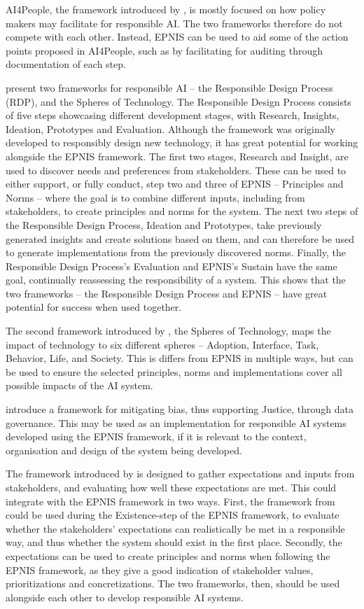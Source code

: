 AI4People, the framework introduced by \textcite{Floridi_2018}, is mostly focused on how policy makers may facilitate for responsible AI. The two frameworks therefore do not compete with each other. Instead, EPNIS can be used to aid some of the action points proposed in AI4People, such as by facilitating for auditing through documentation of each step.

\textcite{Peters_2020} present two frameworks for responsible AI -- the Responsible Design Process (RDP), and the Spheres of Technology. The Responsible Design Process consists of five steps showcasing different development stages, with Research, Insights, Ideation, Prototypes and Evaluation. Although the framework was originally developed to responsibly design new technology, it has great potential for working alongside the EPNIS framework. The first two stages, Research and Insight, are used to discover needs and preferences from stakeholders. These can be used to either support, or fully conduct, step two and three of EPNIS -- Principles and Norms -- where the goal is to combine different inputs, including from stakeholders, to create principles and norms for the system. The next two steps of the Responsible Design Process, Ideation and Prototypes, take previously generated insights and create solutions based on them, and can therefore be used to generate implementations from the previously discovered norms. Finally, the Responsible Design Process's Evaluation and EPNIS's Sustain have the same goal, continually reassessing the responsibility of a system. This shows that the two frameworks -- the Responsible Design Process and EPNIS -- have great potential for success when used together.

The second framework introduced by \textcite{Peters_2020}, the Spheres of Technology, maps the impact of technology to six different spheres -- Adoption, Interface, Task, Behavior, Life, and Society. This is differs from EPNIS in multiple ways, but can be used to ensure the selected principles, norms and implementations cover all possible impacts of the AI system.

\textcite{Werder_2022} introduce a framework for mitigating bias, thus supporting Justice, through data governance. This may be used as an implementation for responsible AI systems developed using the EPNIS framework, if it is relevant to the context, organisation and design of the system being developed.

The framework introduced by \textcite{Wright_2018} is designed to gather expectations and inputs from stakeholders, and evaluating how well these expectations are met. This could integrate with the EPNIS framework in two ways. First, the framework from \textcite{Wright_2018} could be used during the Existence-step of the EPNIS framework, to evaluate whether the stakeholders' expectations can realistically be met in a responsible way, and thus whether the system should exist in the first place. Secondly, the expectations can be used to create principles and norms when following the EPNIS framework, as they give a good indication of stakeholder values, prioritizations and concretizations. The two frameworks, then, should be used alongside each other to develop responsible AI systems.

